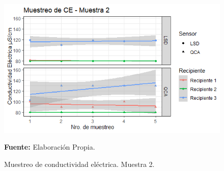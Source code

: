     \begin{figure}[H]
        \centering
        \includegraphics[width=0.75\linewidth]{Imagenes/cap4/CE_M2.png}
        \caption {Muestreo de conductividad el\'ectrica. Muestra 2. }{\textbf{Fuente:}
        Elaboraci\'on Propia. }
        \label{fig:M2CE}
    \end{figure}

